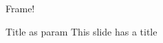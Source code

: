 \documentclass{beamer}
\begin{document}
\begin{frame}
    Frame!
\end{frame}

\begin{frame}{Title as param}
    This slide has a title
\end{frame}
\end{document}
